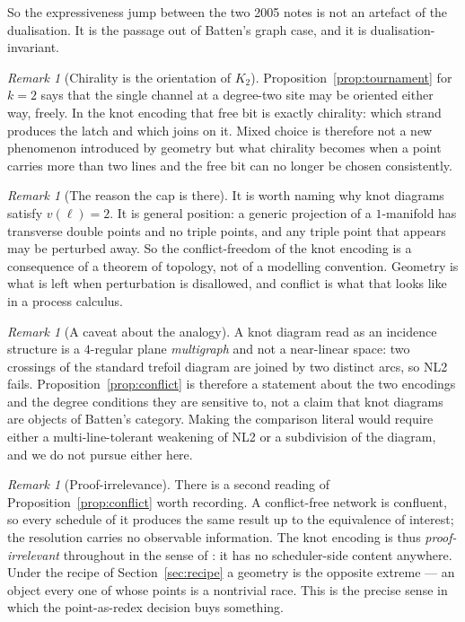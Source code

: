 \documentclass[11pt]{article}
\theoremstyle{plain}
\theoremstyle{definition}
\theoremstyle{remark}
\newtheorem{remark}[theorem]{Remark}
\begin{document}
So the expressiveness jump between the two 2005 notes is not an artefact of the
dualisation. It is the passage out of Batten's graph case, and it is dualisation-invariant.

\begin{remark}[Chirality is the orientation of $K_2$]
Proposition~\ref{prop:tournament} for $k=2$ says that the single channel at a degree-two
site may be oriented either way, freely. In the knot encoding that free bit is exactly
chirality: which strand produces the latch and which joins on it. Mixed choice is
therefore not a new phenomenon introduced by geometry but what chirality becomes when a
point carries more than two lines and the free bit can no longer be chosen consistently.
\end{remark}

\begin{remark}[The reason the cap is there]
It is worth naming why knot diagrams satisfy $v(\ell) = 2$. It is general position: a
generic projection of a $1$-manifold has transverse double points and no triple points,
and any triple point that appears may be perturbed away. So the conflict-freedom of the
knot encoding is a consequence of a theorem of topology, not of a modelling convention.
Geometry is what is left when perturbation is disallowed, and conflict is what that looks
like in a process calculus.
\end{remark}

\begin{remark}[A caveat about the analogy]
A knot diagram read as an incidence structure is a $4$-regular plane \emph{multigraph} and
not a near-linear space: two crossings of the standard trefoil diagram are joined by two
distinct arcs, so NL2 fails. Proposition~\ref{prop:conflict} is therefore a statement about
the two encodings and the degree conditions they are sensitive to, not a claim that knot
diagrams are objects of Batten's category. Making the comparison literal would require
either a multi-line-tolerant weakening of NL2 or a subdivision of the diagram, and we do
not pursue either here.
\end{remark}

\begin{remark}[Proof-irrelevance]
There is a second reading of Proposition~\ref{prop:conflict} worth recording. A
conflict-free network is confluent, so every schedule of it produces the same result up to
the equivalence of interest; the resolution carries no observable information. The knot
encoding is thus \emph{proof-irrelevant} throughout in the sense of \cite{Choice}: it has
no scheduler-side content anywhere. Under the recipe of Section~\ref{sec:recipe} a
geometry is the opposite extreme --- an object every one of whose points is a nontrivial
race. This is the precise sense in which the point-as-redex decision buys something.
\end{remark}
\end{document}
